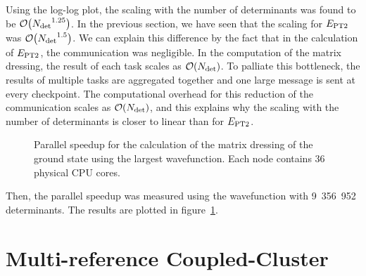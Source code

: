 \documentclass[./thesis.tex]{subfiles}
\begin{document}
Using the log-log plot, the scaling with the number of determinants was found to be
$\order{\Ndet^{1.25}}$. In the previous section, we have seen that the scaling for $E_\text{PT2}$ was
$\order{\Ndet^{1.5}}$. We can explain this difference by the fact that in the 
calculation of $E_\text{PT2}$, the communication was negligible. In the computation of the
matrix dressing, the result of each task scales as $\order{\Ndet}$. To palliate this 
bottleneck, the results of multiple tasks are aggregated together and one large message is
sent at every checkpoint. The computational overhead for this reduction of the communication
scales as $\order{\Ndet}$, and this explains why the scaling with the number of determinants is
closer to linear than for $E_\text{PT2}$.

\begin{figure}[hbt]
	\begin{center}
		\caption{Parallel speedup for the calculation of the matrix dressing of the ground state using the largest wavefunction. Each node contains 36 physical CPU cores.}
		\label{fig:scaling_node_sbk}
	\end{center}
\end{figure}

Then, the parallel speedup was measured using the wavefunction with 9~356~952 determinants. The results
are plotted in figure~\ref{fig:scaling_node_sbk}.

\clearpage

\section{Multi-reference Coupled-Cluster}
\end{document}
